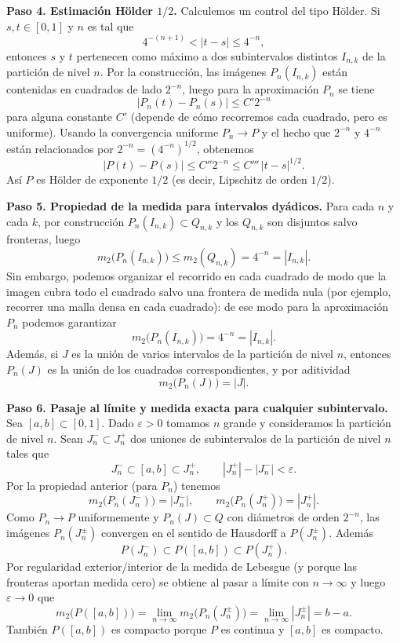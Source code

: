 \begin{solucion}
\textbf{Paso 4. Estimación Hölder \(1/2\).}
Calculemos un control del tipo Hölder. Si \(s,t\in[0,1]\) y \(n\) es tal que
\[
4^{-(n+1)}<|t-s|\le 4^{-n},
\]
entonces \(s\) y \(t\) pertenecen como máximo a dos subintervalos distintos \(I_{n,k}\) de la partición de nivel \(n\). Por la construcción, las imágenes \(P_n(I_{n,k})\) están contenidas en cuadrados de lado \(2^{-n}\), luego para la aproximación \(P_n\) se tiene
\[
|P_n(t)-P_n(s)|\le C' 2^{-n}
\]
para alguna constante \(C'\) (depende de cómo recorremos cada cuadrado, pero es uniforme). Usando la convergencia uniforme \(P_n\to P\) y el hecho que \(2^{-n}\) y \(4^{-n}\) están relacionados por \(2^{-n}=(4^{-n})^{1/2}\), obtenemos
\[
|P(t)-P(s)| \le C'' 2^{-n} \le C'''\,|t-s|^{1/2}.
\]
Así \(P\) es Hölder de exponente \(1/2\) (es decir, Lipschitz de orden \(1/2\)).

\textbf{Paso 5. Propiedad de la medida para intervalos dyádicos.}
Para cada \(n\) y cada \(k\), por construcción \(P_n(I_{n,k})\subset Q_{n,k}\) y los \(Q_{n,k}\) son disjuntos salvo fronteras, luego
\[
m_2\big(P_n(I_{n,k})\big)\le m_2(Q_{n,k})=4^{-n}=|I_{n,k}|.
\]
Sin embargo, podemos organizar el recorrido en cada cuadrado de modo que la imagen cubra todo el cuadrado salvo una frontera de medida nula (por ejemplo, recorrer una malla densa en cada cuadrado): de ese modo para la aproximación \(P_n\) podemos garantizar
\[
m_2\big(P_n(I_{n,k})\big)=4^{-n}=|I_{n,k}|.
\]
Además, si \(J\) es la unión de varios intervalos de la partición de nivel \(n\), entonces \(P_n(J)\) es la unión de los cuadrados correspondientes, y por aditividad
\[
m_2\big(P_n(J)\big)=|J|.
\]

\textbf{Paso 6. Pasaje al límite y medida exacta para cualquier subintervalo.}
Sea \([a,b]\subset[0,1]\). Dado \(\varepsilon>0\) tomamos \(n\) grande y consideramos la partición de nivel \(n\). Sean \(J_n^-\subset J_n^+\) dos uniones de subintervalos de la partición de nivel \(n\) tales que
\[
J_n^-\subset[a,b]\subset J_n^+,\qquad |J_n^+|-|J_n^-|<\varepsilon.
\]
Por la propiedad anterior (para \(P_n\)) tenemos
\[
m_2\big(P_n(J_n^-)\big)=|J_n^-|,\qquad m_2\big(P_n(J_n^+)\big)=|J_n^+|.
\]
Como \(P_n\to P\) uniformemente y \(P_n(J)\subset Q\) con diámetros de orden \(2^{-n}\), las imágenes \(P_n(J_n^\pm)\) convergen en el sentido de Hausdorff a \(P(J_n^\pm)\). Además
\[
P(J_n^-)\subset P([a,b])\subset P(J_n^+).
\]
Por regularidad exterior/interior de la medida de Lebesgue (y porque las fronteras aportan medida cero) se obtiene al pasar a límite con \(n\to\infty\) y luego \(\varepsilon\to 0\) que
\[
m_2\big(P([a,b])\big)=\lim_{n\to\infty} m_2\big(P_n(J_n^\pm)\big)=\lim_{n\to\infty} |J_n^\pm|=b-a.
\]
También \(P([a,b])\) es compacto porque \(P\) es continua y \([a,b]\) es compacto.


\end{solucion}
